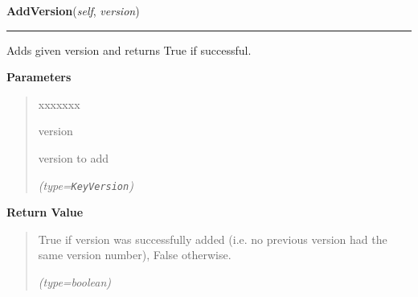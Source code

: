 \hspace{.8\funcindent}\begin{boxedminipage}{\funcwidth}

    \raggedright \textbf{AddVersion}(\textit{self}, \textit{version})

    \vspace{-1.5ex}

    \rule{\textwidth}{0.5\fboxrule}
\setlength{\parskip}{2ex}
    Adds given version and returns True if successful.

\setlength{\parskip}{1ex}
      \textbf{Parameters}
      \vspace{-1ex}

      \begin{quote}
        \begin{Ventry}{xxxxxxx}

          \item[version]

          version to add

            {\it (type=\texttt{KeyVersion})}

        \end{Ventry}

      \end{quote}

      \textbf{Return Value}
    \vspace{-1ex}

      \begin{quote}
      True if version was successfully added (i.e. no previous version had 
      the same version number), False otherwise.

      {\it (type=boolean)}

      \end{quote}

    \end{boxedminipage}

    \label{keyczar:keydata:KeyMetadata:RemoveVersion}

    \vspace{0.5ex}

